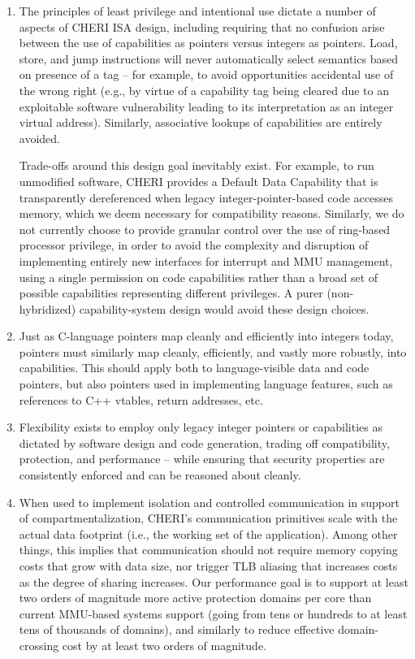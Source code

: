 \begin{enumerate}
\item The principles of least privilege and intentional use dictate a number
  of aspects of CHERI ISA design, including requiring that no confusion arise
  between the use of capabilities as pointers versus integers as pointers.
  Load, store, and jump instructions will never automatically select
  semantics based on presence of a tag -- for example, to avoid opportunities
  accidental use of the wrong right (e.g., by virtue of a capability tag being
  cleared due to an exploitable software vulnerability leading to its
  interpretation as an integer virtual address).
  Similarly, associative lookups of capabilities are entirely avoided.

  Trade-offs around this design goal inevitably exist.
  For example, to run unmodified software, CHERI provides a Default Data
  Capability that is transparently dereferenced when legacy
  integer-pointer-based code accesses memory, which we deem necessary for
  compatibility reasons.
  Similarly, we do not currently choose to provide granular control over the
  use of ring-based processor privilege, in order to avoid the complexity and
  disruption of implementing entirely new interfaces for interrupt and MMU
  management, using a single permission on code capabilities rather than a
  broad set of possible capabilities representing different privileges.
  A purer (non-hybridized) capability-system design would avoid these
  design choices.

\item Just as C-language pointers map cleanly and efficiently into integers
  today, pointers must similarly map cleanly, efficiently, and vastly more
  robustly, into capabilities.
  This should apply both to language-visible data and code pointers, but also
  pointers used in implementing language features, such as references to
  C++ vtables, return addresses, etc.

\item Flexibility exists to employ only legacy integer pointers or
  capabilities as dictated by software design and code generation, trading off
  compatibility, protection, and performance -- while ensuring that security
  properties are consistently enforced and can be reasoned about cleanly.

\item When used to implement isolation and controlled communication in support
  of compartmentalization, CHERI's communication primitives scale with the
  actual data footprint (i.e., the working set of the application).
  Among other things, this implies that communication should not require
  memory copying costs that grow with data size, nor trigger TLB aliasing
  that increases costs as the degree of sharing increases.
  Our performance goal is to support at least two orders of magnitude more
  active protection domains per core than current MMU-based systems support
  (going from tens or hundreds to at least tens of thousands of domains), and
  similarly to reduce effective domain-crossing cost by at least two orders of
  magnitude.


\end{enumerate}
